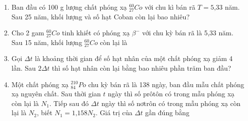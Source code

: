 \begin{enumerate}
	\item {Ban đầu có 100 g lượng chất phóng xạ $^{60}_{27}Co$ với chu kì bán rã $T=\text{5,33}$ năm. Sau 25 năm, khối lượng và số hạt Coban còn lại bao nhiêu?
	}
	\item{Cho 2 gam $^{60}_{27}Co$ tinh khiết có phóng xạ $\beta^{-}$ với chu kỳ bán rã là 5,33 năm. Sau 15 năm, khối lượng $^{60}_{27}Co$ còn lại là
	}
	\item{Gọi $\Delta t$ là khoảng thời gian để số hạt nhân của một chất phóng xạ giảm 4 lần. Sau $2\Delta t$  thì số hạt nhân còn lại bằng bao nhiêu phần trăm ban đầu?
	}
	\item{Một chất phóng xạ $^{210}_{84} Po$ chu kỳ bán rã là 138 ngày, ban đầu mẫu chất phóng xạ nguyên chất. Sau thời gian $t$ ngày thì số prôtôn có trong mẫu phóng xạ còn lại là $N_1$. Tiếp sau đó $\Delta t$ ngày thì số nơtrôn có trong mẫu phóng xạ còn lại là $N_2$, biết $N_1=\text{1,158}N_2$. Giá trị của $\Delta t$ gần đúng bằng
}
\end{enumerate}
